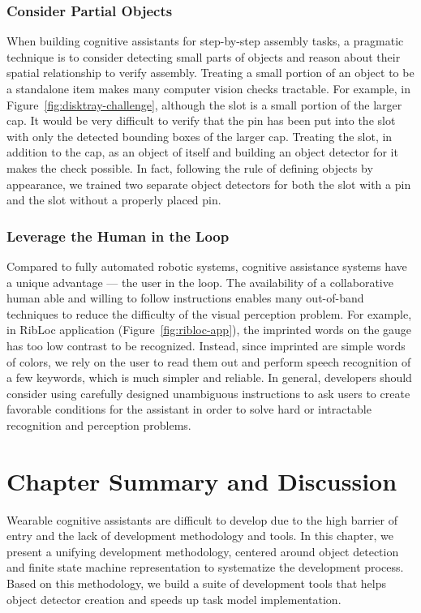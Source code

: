 \subsubsection{Consider Partial Objects}

When building cognitive assistants for step-by-step assembly tasks, a pragmatic
technique is to consider detecting small parts of objects and reason about their
spatial relationship to verify assembly. Treating a small portion of an object
to be a standalone item makes many computer vision checks tractable. For
example, in Figure~\ref{fig:disktray-challenge}, although the slot is a small
portion of the larger cap. It would be very difficult to verify that the pin has
been put into the slot with only the detected bounding boxes of the larger cap.
Treating the slot, in addition to the cap, as an object of itself and building
an object detector for it makes the check possible. In fact, following the
rule of defining objects by appearance, we trained two separate object detectors
for both the slot with a pin and the slot without a properly placed pin.

\subsubsection{Leverage the Human in the Loop}

Compared to fully automated robotic systems, cognitive assistance systems have a
unique advantage --- the user in the loop. The availability of a collaborative
human able and willing to follow instructions enables many out-of-band
techniques to reduce the difficulty of the visual perception problem. For
example, in RibLoc application (Figure~\ref{fig:ribloc-app}), the imprinted
words on the gauge has too low contrast to be recognized. Instead, since
imprinted are simple words of colors, we rely on the user to read them out and
perform speech recognition of a few keywords, which is much simpler and
reliable. In general, developers should consider using carefully designed
unambiguous instructions to ask users to create favorable conditions for the
assistant in order to solve hard or intractable recognition and perception problems.

\section{Chapter Summary and Discussion}

Wearable cognitive assistants are difficult to develop due to the high barrier of
entry and the lack of development methodology and tools. In this chapter, we
present a unifying development methodology, centered around object detection and
finite state machine representation to systematize the development process.
Based on this methodology, we build a suite of development tools that helps
object detector creation and speeds up task model implementation.

